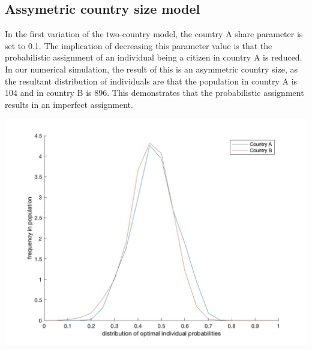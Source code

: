 \documentclass[11pt,preprint, authoryear]{elsarticle}
\let\origfigure\figure
\let\endorigfigure\endfigure
\renewenvironment{figure}[1][2] {
    \expandafter\origfigure\expandafter[H]
} {
    \endorigfigure
}
\numberwithin{equation}{section}
\numberwithin{figure}{section}
\numberwithin{table}{section}
\begin{document}
\hypertarget{assymetric-country-size-model}{%
\subsection*{Assymetric country size
model}\label{assymetric-country-size-model}}

In the first variation of the two-country model, the country A share
parameter is set to 0.1. The implication of decreasing this parameter
value is that the probabilistic assignment of an individual being a
citizen in country A is reduced. In our numerical simulation, the result
of this is an asymmetric country size, as the resultant distribution of
individuals are that the population in country A is 104 and in country B
is 896. This demonstrates that the probabilistic assignment results in
an imperfect assignment.

\begin{figure}[H]

{\centering \includegraphics[width=0.8\linewidth]{images/Fig4_0.1Size0Bias} 

}

\caption{Assymetric country size model: Kernel density function of the distribution of the optimal probabilty of crisis and frequency thereof across individuals in country A and country B}\label{fig:unnamed-chunk-5}
\end{figure}
\end{document}
